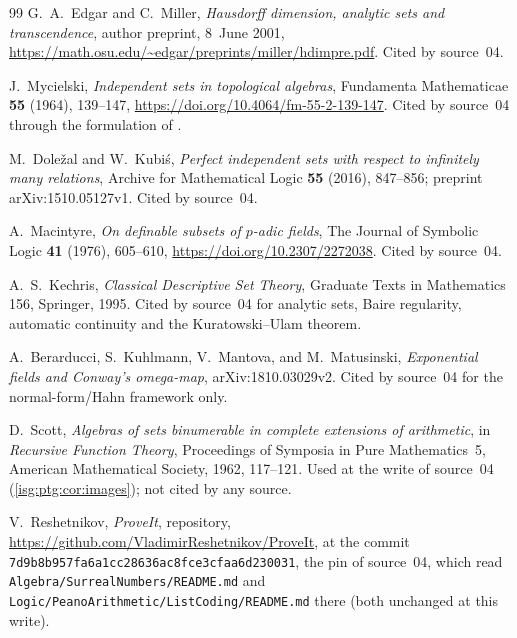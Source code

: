 \documentclass[11pt]{article}
\theoremstyle{definition}
\theoremstyle{remark}
\newcommand{\fn}[1]{\nolinkurl{#1}}
\begin{document}
\begin{thebibliography}{99}
G.~A.~Edgar and C.~Miller, \emph{Hausdorff dimension, analytic sets and
transcendence}, author preprint, 8~June 2001,
\url{https://math.osu.edu/~edgar/preprints/miller/hdimpre.pdf}. Cited by
source~04.

J.~Mycielski, \emph{Independent sets in topological algebras}, Fundamenta
Mathematicae \textbf{55} (1964), 139--147,
\url{https://doi.org/10.4064/fm-55-2-139-147}. Cited by source~04 through
the formulation of \cite[Theorem~1]{DolezalKubis}.

M.~Dole\v zal and W.~Kubi\'s, \emph{Perfect independent sets with respect
to infinitely many relations}, Archive for Mathematical Logic \textbf{55}
(2016), 847--856; preprint arXiv:1510.05127v1. Cited by source~04.

A.~Macintyre, \emph{On definable subsets of $p$-adic fields}, The Journal
of Symbolic Logic \textbf{41} (1976), 605--610,
\url{https://doi.org/10.2307/2272038}. Cited by source~04.

A.~S.~Kechris, \emph{Classical Descriptive Set Theory}, Graduate Texts in
Mathematics 156, Springer, 1995. Cited by source~04 for analytic sets,
Baire regularity, automatic continuity and the Kuratowski--Ulam theorem.

A.~Berarducci, S.~Kuhlmann, V.~Mantova, and M.~Matusinski,
\emph{Exponential fields and Conway's omega-map}, arXiv:1810.03029v2.
Cited by source~04 for the normal-form/Hahn framework only.

D.~Scott, \emph{Algebras of sets binumerable in complete extensions of
arithmetic}, in \emph{Recursive Function Theory}, Proceedings of Symposia
in Pure Mathematics~5, American Mathematical Society, 1962, 117--121. Used
at the write of source~04 (\cref{isg:ptg:cor:images}); not cited by any
source.

V.~Reshetnikov, \emph{ProveIt}, repository,
\url{https://github.com/VladimirReshetnikov/ProveIt}, at the commit
\texttt{7d9b8b957fa6a1cc28636ac8fce3cfaa6d230031}, the pin of source~04,
which read \fn{Algebra/SurrealNumbers/README.md} and
\fn{Logic/PeanoArithmetic/ListCoding/README.md} there (both unchanged at
this write).
\end{thebibliography}
\end{document}
